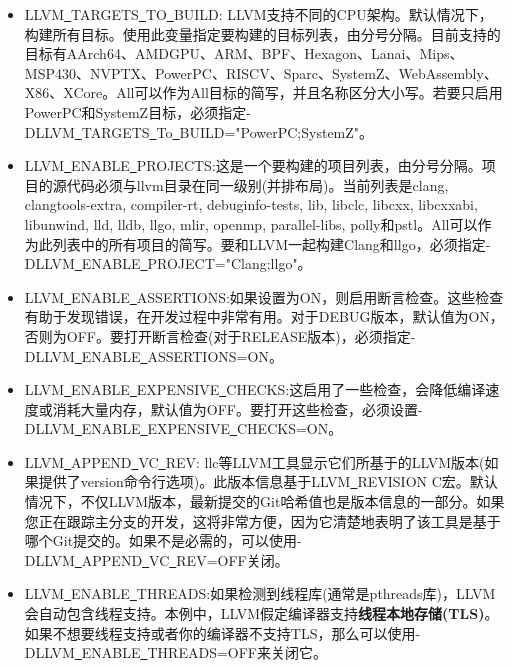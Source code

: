 \begin{itemize}
\item LLVM\underline{~}TARGETS\underline{~}TO\underline{~}BUILD: LLVM支持不同的CPU架构。默认情况下，构建所有目标。使用此变量指定要构建的目标列表，由分号分隔。目前支持的目标有AArch64、AMDGPU、ARM、BPF、Hexagon、Lanai、Mips、MSP430、NVPTX、PowerPC、RISCV、Sparc、SystemZ、WebAssembly、X86、XCore。All可以作为All目标的简写，并且名称区分大小写。若要只启用PowerPC和SystemZ目标，必须指定-DLLVM\underline{~}TARGETS\underline{~}To\underline{~}BUILD="PowerPC;SystemZ"。
	
\item LLVM\underline{~}ENABLE\underline{~}PROJECTS:这是一个要构建的项目列表，由分号分隔。项目的源代码必须与llvm目录在同一级别(并排布局)。当前列表是clang, clangtools-extra, compiler-rt, debuginfo-tests, lib, libclc, libcxx, libcxxabi, libunwind, lld, lldb, llgo, mlir, openmp, parallel-libs, polly和pstl。All可以作为此列表中的所有项目的简写。要和LLVM一起构建Clang和llgo，必须指定-DLLVM\underline{~}ENABLE\underline{~}PROJECT="Clang;llgo"。
	
\item LLVM\underline{~}ENABLE\underline{~}ASSERTIONS:如果设置为ON，则启用断言检查。这些检查有助于发现错误，在开发过程中非常有用。对于DEBUG版本，默认值为ON，否则为OFF。要打开断言检查(对于RELEASE版本)，必须指定-DLLVM\underline{~}ENABLE\underline{~}ASSERTIONS=ON。
	
\item LLVM\underline{~}ENABLE\underline{~}EXPENSIVE\underline{~}CHECKS:这启用了一些检查，会降低编译速度或消耗大量内存，默认值为OFF。要打开这些检查，必须设置-DLLVM\underline{~}ENABLE\underline{~}EXPENSIVE\underline{~}CHECKS=ON。
	
\item LLVM\underline{~}APPEND\underline{~}VC\underline{~}REV: llc等LLVM工具显示它们所基于的LLVM版本(如果提供了version命令行选项)。此版本信息基于LLVM\underline{~}REVISION C宏。默认情况下，不仅LLVM版本，最新提交的Git哈希值也是版本信息的一部分。如果您正在跟踪主分支的开发，这将非常方便，因为它清楚地表明了该工具是基于哪个Git提交的。如果不是必需的，可以使用-DLLVM\underline{~}APPEND\underline{~}VC\underline{~}REV=OFF关闭。
	
\item LLVM\underline{~}ENABLE\underline{~}THREADS:如果检测到线程库(通常是pthreads库)，LLVM会自动包含线程支持。本例中，LLVM假定编译器支持\textbf{线程本地存储(TLS)}。如果不想要线程支持或者你的编译器不支持TLS，那么可以使用-DLLVM\underline{~}ENABLE\underline{~}THREADS=OFF来关闭它。
	

\end{itemize}
